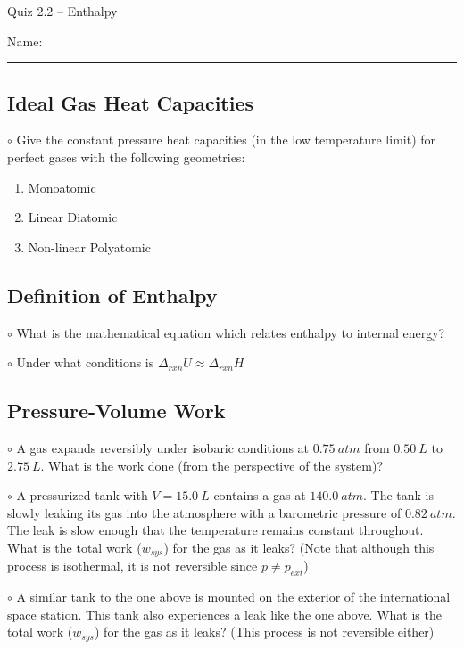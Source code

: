 \documentclass[11pt, letterpaper]{memoir}
\begin{document}
	\begin{center}
		{\large Quiz 2.2 --	Enthalpy}
	\end{center}
	{\large Name: \rule[-1mm]{4in}{.1pt} 

\subsection*{Ideal Gas Heat Capacities}
\noindent$\circ$ Give the constant pressure heat capacities (in the low temperature limit) for perfect gases with the following geometries:
\begin{enumerate}
	\item Monoatomic
	
	\vspace{1em}
	\item Linear Diatomic
	
	\vspace{1em}
	\item Non-linear Polyatomic	
\end{enumerate}

\vspace{1em}
\subsection*{Definition of Enthalpy}
$\circ$ What is the mathematical equation which relates enthalpy to internal energy?

\vspace{3em}
\noindent$\circ$ Under what conditions is $\Delta_{rxn}U\approx \Delta_{rxn}H$

\vspace{2em}
\subsection*{Pressure-Volume Work}
$\circ$ A gas expands reversibly under isobaric conditions at $0.75~atm$ from $0.50~L$ to $2.75~L$. What is the work done (from the perspective of the system)?

\vspace{3em}
\noindent $\circ$ A pressurized tank with $V=15.0~L$ contains a gas at $140.0~atm$. The tank is slowly leaking its gas into the atmosphere with a barometric pressure of $0.82~atm$. The leak is slow enough that the temperature remains constant throughout. What is the total work ($w_{sys}$) for the gas as it leaks? (Note that although this process is isothermal, it is not reversible since $p\neq p_{ext}$)

\vspace{4em}
\noindent $\circ$ A similar tank to the one above is mounted on the exterior of the international space station. This tank also experiences a leak like the one above. What is the total work ($w_{sys}$) for the gas as it leaks? (This process is not reversible either)
\newpage
\pagestyle{empty}
\addtocounter{page}{-1}
}
\end{document}
